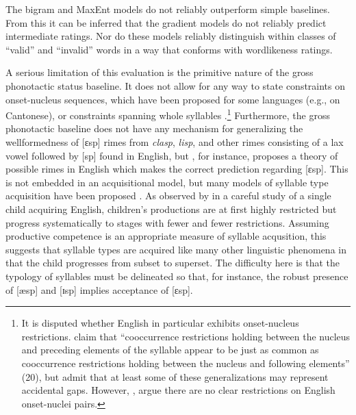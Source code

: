 The bigram and MaxEnt models do not reliably outperform simple baselines. 
From this it can be inferred that the gradient models do not reliably predict intermediate ratings. 
Nor do these models reliably distinguish within classes of ``valid'' and ``invalid'' words in a way that conforms with wordlikeness ratings.

A serious limitation of this evaluation is the primitive nature of the gross phonotactic status baseline. 
It does not allow for any way to state constraints on onset-nucleus sequences, which have been proposed for some languages (e.g., \citealt{Kirby2007} on Cantonese), or constraints spanning whole syllables \citep[e.g.,][]{Berkley1994b,Berkley1994a,Clements1983,Coetzee2008b,Fudge1969}.\footnote{
    It is disputed whether English in particular exhibits onset-nucleus restrictions.
    \citet{Clements1983} claim that ``cooccurrence restrictions holding between the nucleus and preceding elements of the syllable appear to be just as common as cooccurrence restrictions holding between the nucleus and following elements'' (20), but admit that at least some of these generalizations may represent accidental gaps.
    However, \citet{Kessler1997}, argue there are no clear restrictions on English onset-nuclei pairs.}
Furthermore, the gross phonotactic baseline does not have any mechanism for generalizing the wellformedness of [ɛsp] rimes from \emph{clasp}, \emph{lisp}, and other rimes consisting of a lax vowel followed by [sp] found in English, but \citet{Borowsky1989}, for instance, proposes a theory of possible rimes in English which makes the correct prediction regarding [ɛsp].
This is not embedded in an acquisitional model, but many models of syllable type acquisition have been proposed \citep[e.g.,][]{Fikkert1994,Levelt2000,Pan2003,Pan2004}.
As observed by \citet{Smith1973} in a careful study of a single child acquiring English, children's productions are at first highly restricted but progress systematically to stages with fewer and fewer restrictions.
Assuming productive competence is an appropriate measure of syllable acqusition, this suggests that syllable types are acquired like many other linguistic phenomena in that the child progresses from subset to superset.
The difficulty here is that the typology of syllables must be delineated so that, for instance, the robust presence of [æsp] and [ɪsp] implies acceptance of [ɛsp].

